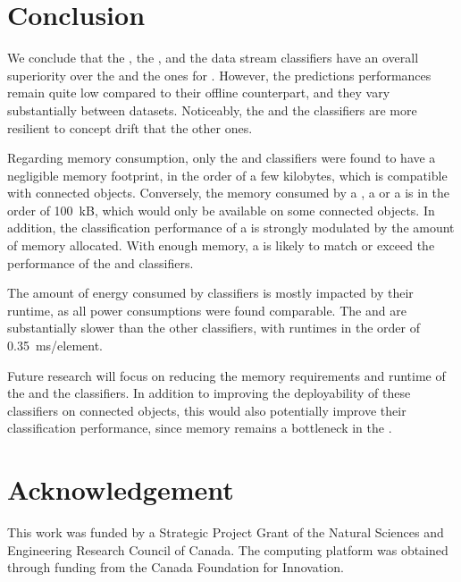 \section{Conclusion}

We conclude that the \hoeffdingtree, the \mondrianforest, and the
\naivebayes data stream classifiers have an overall superiority over the
\FNN and the \mcnns ones for \har.  However, the
predictions performances remain quite low compared to their offline
counterpart, and they vary substantially between datasets. Noticeably, the
\hoeffdingtree and the \mcnns classifiers are more resilient to concept drift that the
other ones.

Regarding memory consumption, only the \mcnns and \naivebayes classifiers
were found to have a negligible memory footprint, in the order of a few
kilobytes, which is compatible with connected objects. Conversely, the
memory consumed by a \mondrianforest, a \FNN or a \hoeffdingtree is in the
order of 100~kB, which would only be available on some connected objects.
In addition, the classification performance of a \mondrianforest is
strongly modulated by the amount of memory allocated. With enough memory, a
\mondrianforest is likely to match or exceed the performance of the
\hoeffdingtree and \naivebayes classifiers.

The amount of energy consumed by classifiers is mostly impacted by their
runtime, as all power consumptions were found comparable. The
\hoeffdingtree and \mondrianforest are substantially slower than the other
classifiers, with runtimes in the order of 0.35~ms/element. 

Future research will focus on reducing the memory requirements and runtime
of the \hoeffdingtree and the \mondrianforest classifiers. In addition to
improving the deployability of these classifiers on connected objects, this
would also potentially improve their classification performance, since
memory remains a bottleneck in the \mondrianforest.

\section*{Acknowledgement}
This work was funded by a Strategic Project Grant of the Natural Sciences
and Engineering Research Council of Canada. The computing platform was
obtained through funding from the Canada Foundation for Innovation.

